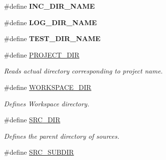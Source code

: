 \begin{DoxyCompactItemize}
\item 
\hypertarget{group___automatic___variables_ga7824bb533c1132aa392dc850e8cab836}{\#define {\bfseries I\+N\+C\+\_\+\+D\+I\+R\+\_\+\+N\+A\+M\+E}}\label{group___automatic___variables_ga7824bb533c1132aa392dc850e8cab836}

\item 
\hypertarget{group___automatic___variables_ga741001f8715eba92ba3f154de62a16ed}{\#define {\bfseries L\+O\+G\+\_\+\+D\+I\+R\+\_\+\+N\+A\+M\+E}}\label{group___automatic___variables_ga741001f8715eba92ba3f154de62a16ed}

\item 
\hypertarget{group___automatic___variables_gaa7bd71e6a1d9206071565efb4c41d03c}{\#define {\bfseries T\+E\+S\+T\+\_\+\+D\+I\+R\+\_\+\+N\+A\+M\+E}}\label{group___automatic___variables_gaa7bd71e6a1d9206071565efb4c41d03c}

\item 
\hypertarget{group___automatic___variables_ga7812f6263b920beedc05a29cb73bcf8e}{\#define \hyperlink{group___automatic___variables_ga7812f6263b920beedc05a29cb73bcf8e}{P\+R\+O\+J\+E\+C\+T\+\_\+\+D\+I\+R}}\label{group___automatic___variables_ga7812f6263b920beedc05a29cb73bcf8e}

\begin{DoxyCompactList}\small\item\em Reads actual directory corresponding to project name. \end{DoxyCompactList}\item 
\hypertarget{group___automatic___variables_gace0ce5c5385c943349972405f2ada479}{\#define \hyperlink{group___automatic___variables_gace0ce5c5385c943349972405f2ada479}{W\+O\+R\+K\+S\+P\+A\+C\+E\+\_\+\+D\+I\+R}}\label{group___automatic___variables_gace0ce5c5385c943349972405f2ada479}

\begin{DoxyCompactList}\small\item\em Defines Workspace directory. \end{DoxyCompactList}\item 
\hypertarget{group___automatic___variables_ga3160a3fa704cbc54d669767276e0124f}{\#define \hyperlink{group___automatic___variables_ga3160a3fa704cbc54d669767276e0124f}{S\+R\+C\+\_\+\+D\+I\+R}}\label{group___automatic___variables_ga3160a3fa704cbc54d669767276e0124f}

\begin{DoxyCompactList}\small\item\em Defines the parent directory of sources. \end{DoxyCompactList}\item 
\hypertarget{group___automatic___variables_ga310dd0d61daffc990beba1d19af9f47e}{\#define \hyperlink{group___automatic___variables_ga310dd0d61daffc990beba1d19af9f47e}{S\+R\+C\+\_\+\+S\+U\+B\+D\+I\+R}}\label{group___automatic___variables_ga310dd0d61daffc990beba1d19af9f47e}


\end{DoxyCompactItemize}
